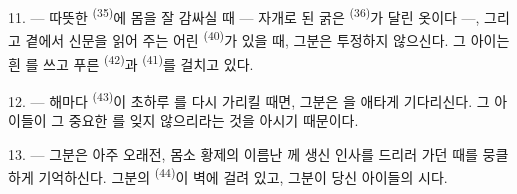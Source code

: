 11. --- 따뜻한  \textsuperscript{(35)}에 몸을 잘 감싸실 때 — 자개로 된
굵은  \textsuperscript{(36)}가 달린 옷이다 —, 그리고 곁에서 신문을 읽어 주는
어린  \textsuperscript{(40)}가 있을 때, 그분은 투정하지 않으신다. 그
아이는 흰 를 쓰고 푸른  \textsuperscript{(42)}과
 \textsuperscript{(41)}를 걸치고 있다.

12. --- 해마다  \textsuperscript{(43)}이  초하루
를 다시 가리킬 때면, 그분은 을 애타게 기다리신다. 그
아이들이 그 중요한 를 잊지 않으리라는 것을 아시기 때문이다.

13. --- 그분은 아주 오래전, 몸소 황제의 이름난 께 생신 인사를 드리러 가던
때를 뭉클하게 기억하신다. 그분의  \textsuperscript{(44)}이 벽에 걸려 있고,
그분이 당신 아이들의 시다.

\VUsaut{6.0mm}
\VUfilet{22mm}
